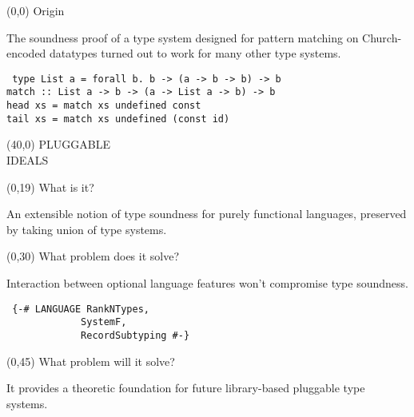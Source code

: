 \documentclass[a0]{a0poster}
\def\FONTSIZE#1{\fontsize{#1}{#1}\selectfont}
\def\HEAD#1{{\FONTSIZE{72}#1}}
\newenvironment{CODE}{\tt\FONTSIZE{36}\null}{}
\begin{document}
\raggedright
\FONTSIZE{48}

\begin{textblock}{37}(0,0)%
\HEAD{Origin}

The soundness proof of a type system designed for pattern
matching on Church-encoded datatypes turned out to work for many
other type systems.

\begin{CODE}
type List a = forall b. b -> (a -> b -> b) -> b\\
match ::~List a -> b -> (a -> List a -> b) -> b\\
head xs = match xs undefined const\\
tail xs = match xs undefined (const id)\\
\end{CODE}
\end{textblock}

\begin{textblock}{71}(40,0)
{\FONTSIZE{320}%
PLUGGABLE\\
IDEALS
}
\end{textblock}

\begin{textblock}{30}(0,19)
\HEAD{What is it?}

An extensible notion of type soundness for purely functional
languages, preserved by taking union of type systems.
\end{textblock}

\begin{textblock}{30}(0,30)
\HEAD{What problem does it solve?}

Interaction between optional language features won't compromise
type soundness.

\begin{CODE}
\def\INDENT{~~~~~~~~~~~~~}
\{-\# LANGUAGE RankNTypes,\\
\INDENT SystemF,\\
\INDENT RecordSubtyping \#-\}
\end{CODE}
\end{textblock}

\begin{textblock}{30}(0,45)
\HEAD{What problem will it solve?}

It provides a theoretic foundation for future library-based
pluggable type systems.
\end{textblock}
\end{document}
